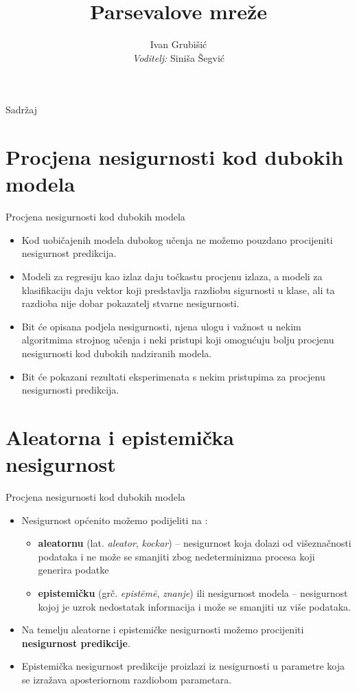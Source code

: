 \documentclass{beamer}
\title{Parsevalove mreže}
\author{Ivan Grubišić \\ \emph{Voditelj:} Siniša Šegvić}
\institute{Fakultet elektrotehnike i računarstva}
\date{}
\begin{document}
	
\begin{frame}
  \titlepage
\end{frame}

\begin{frame}{Sadržaj}
  \tableofcontents
\end{frame}


\section{Procjena nesigurnosti kod dubokih modela}

\begin{frame}{Procjena nesigurnosti kod dubokih modela}
	\begin{itemize}
		\item Kod uobičajenih modela dubokog učenja ne možemo pouzdano procijeniti nesigurnost predikcija. 
		\item Modeli za regresiju kao izlaz daju točkastu procjenu izlaza, a modeli za klasifikaciju daju vektor koji predstavlja razdiobu sigurnosti u klase, ali ta razdioba nije dobar pokazatelj stvarne nesigurnosti.
	\end{itemize}
	\begin{itemize}
		\item Bit će opisana podjela nesigurnosti, njena ulogu i važnost u nekim algoritmima strojnog učenja i neki pristupi koji omogućuju bolju procjenu nesigurnosti kod dubokih nadziranih modela.
		\item Bit će pokazani rezultati eksperimenata s nekim pristupima za procjenu nesigurnosti predikcija.
	\end{itemize}
\end{frame}


\section{Aleatorna i epistemička nesigurnost}

\begin{frame}{Procjena nesigurnosti kod dubokih modela}
	\begin{itemize}
		\item Nesigurnost općenito možemo podijeliti na \cite{Kiureghian:2009:AEDM}: 
		\begin{itemize}
			\item \textbf{aleatornu} (lat. \textit{aleator}, \textit{kockar}) -- nesigurnost koja dolazi od višeznačnosti podataka i ne može se smanjiti zbog nedeterminizma procesa koji generira podatke
			\item \textbf{epistemičku} (grč. \textit{epist\={e}m\={e}}, \textit{znanje}) ili nesigurnost modela -- nesigurnost kojoj je uzrok nedostatak informacija i može se smanjiti uz više podataka.
		\end{itemize}
		\item Na temelju aleatorne i epistemičke nesigurnosti možemo procijeniti \textbf{nesigurnost predikcije}. 
		\item Epistemička nesigurnost predikcije proizlazi iz nesigurnosti u parametre koja se izražava aposteriornom razdiobom parametara. 
	\end{itemize}
\end{frame}
\end{document}
